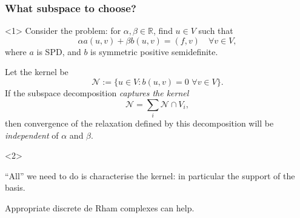 \documentclass[presentation,aspectratio=43, 10pt]{beamer}
\begin{document}
\begin{frame}
  \frametitle{What subspace to choose?}
  \begin{onlyenv}<1> Consider the problem: for
    $\alpha, \beta \in \mathbb{R}$, find $u \in V$ such that
    \begin{equation*}
      \alpha a(u, v) + \beta b(u, v) = (f, v) \quad \forall v \in V,
    \end{equation*}
    where $a$ is SPD, and $b$ is symmetric positive semidefinite.
  \end{onlyenv}
  \begin{theorem}
    Let the kernel be
    \begin{equation*}
      \mathcal{N} := \{ u \in V : b(u, v) = 0 \,\, \forall v \in V \}.
    \end{equation*}
    If the subspace decomposition \emph{captures the kernel}
    \begin{equation*}
      \mathcal{N} = \sum_i \mathcal{N} \cap V_i,
    \end{equation*}
    then convergence of the relaxation defined by this decomposition
    will be \emph{independent} of $\alpha$ and $\beta$.
    \nocite{Schoeberl:1999,Lee:2007}
  \end{theorem}
  \begin{onlyenv}<2>
    \begin{corollary}
      ``All'' we need to do is characterise the kernel: in particular
      the support of the basis.

      Appropriate discrete de Rham complexes can help.
    \end{corollary}
  \end{onlyenv}
\end{frame}
\end{document}
